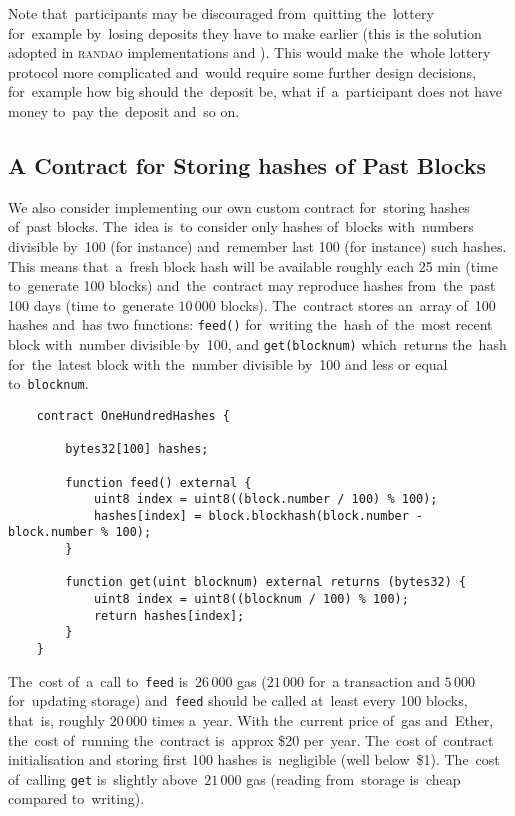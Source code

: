 \documentclass[a4paper]{article}
\newcommand{\randao}{\textsc{randao}}
\begin{document}
    Note that~participants may be discouraged from~quitting the~lottery for~example by~losing deposits they have to
    make earlier (this is the solution adopted in \randao{} implementations \cite{RANDAO} and \cite{RANDAO2}).
    This would make the~whole lottery protocol more complicated and~would require some further design
    decisions, for~example how big should the~deposit be, what if~a~participant does not have money to~pay the~deposit
    and~so on.

    \subsection{A Contract for Storing hashes of Past Blocks}
    \label{sec:hundred}
    We also consider implementing our own custom contract for~storing hashes of~past blocks.
    The~idea is~to consider only hashes of~blocks with~numbers divisible by~100 (for instance) and~remember last 100
    (for instance) such hashes. This means that~a~fresh block hash will be available roughly each 25 min
    (time to~generate 100 blocks) and~the~contract may reproduce hashes from~the~past 100 days
    (time to~generate $10\,000$ blocks). The~contract stores an~array of~100 hashes and~has two functions:
    \texttt{feed()} for~writing the~hash of~the~most recent block with~number divisible by~100, and
    \texttt{get(blocknum)} which~returns the~hash for~the~latest block with the~number divisible by~100 and less
    or equal to~\texttt{blocknum}.
    \begin{lstlisting}
    contract OneHundredHashes {
        
        bytes32[100] hashes;

        function feed() external {
            uint8 index = uint8((block.number / 100) % 100);
            hashes[index] = block.blockhash(block.number - block.number % 100);
        }

        function get(uint blocknum) external returns (bytes32) {
            uint8 index = uint8((blocknum / 100) % 100);
            return hashes[index];
        }
    }    
    \end{lstlisting}
    The~cost of~a~call to~\verb!feed! is~$26\,000$ gas ($21\,000$ for~a transaction and $5\,000$ for~updating storage)
    and~\verb!feed! should be called at~least every 100 blocks, that~is, roughly $20\,000$ times a~year. With the~current
    price of~gas and~Ether, the~cost of~running the~contract is~approx \$20 per~year. The~cost of~contract initialisation and
    storing first 100 hashes is~negligible (well below~\$1). The~cost of~calling \verb!get! is~slightly above~$21\,000$ gas
    (reading from~storage is~cheap compared to~writing).
\end{document}
